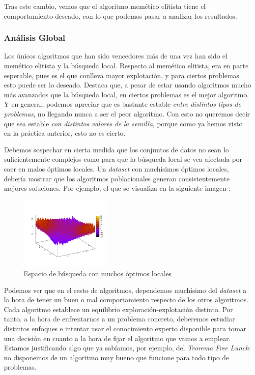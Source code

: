 \documentclass[11pt]{article}
\begin{document}
Tras este cambio, vemos que el algoritmo memético elitista tiene el comportamiento deseado, con lo que podemos pasar a analizar los resultados.

\subsubsection{Análisis Global}

Los únicos algoritmos que han sido vencedores más de una vez han sido el memético elitista y la búsqueda local. Respecto al memético elitista, era en parte esperable, pues es el que conlleva mayor explotación, y para ciertos problemas esto puede ser lo deseado. Destaca que, a pesar de estar usando algoritmos mucho más avanzados que la búsqueda local, en ciertos problemas es el mejor algoritmo. Y en general, podemos apreciar que es bastante estable \emph{entre distintos tipos de problemas}, no llegando nunca a ser el peor algoritmo. Con esto no queremos decir que sea estable \emph{con distintos valores de la semilla}, porque como ya hemos visto en la práctica anterior, esto no es cierto.

Debemos sospechar en cierta medida que los conjuntos de datos no sean lo suficientemente complejos como para que la búsqueda local se vea afectada por caer en malos óptimos locales. Un \emph{dataset} con muchísimos óptimos locales, debería mostrar que los algoritmos poblacionales generan consistentemente mejores soluciones. Por ejemplo, el que se visualiza en la siguiente imagen \footnotemark:

\begin{figure}[H]
    \centering
    \includegraphics[width=0.4\textwidth]{search_space}
    \caption{Espacio de búsqueda con muchos óptimos locales}
\end{figure}


Podemos ver que en el resto de algoritmos, dependemos muchísimo del \emph{dataset} a la hora de tener un buen o mal comportamiento respecto de los otros algoritmos. Cada algoritmo establece un equilibrio exploración-explotación distinto. Por tanto, a la hora de enfrentarnos a un problema concreto, deberemos estudiar distintos enfoques e intentar usar el conocimiento experto disponible para tomar una decisión en cuanto a la hora de fijar el algoritmo que vamos a emplear. Estamos justificando algo que ya sabíamos, por ejemplo, del \emph{Teorema Free Lunch}: no disponemos de un algoritmo muy bueno que funcione para todo tipo de problemas.
\end{document}
